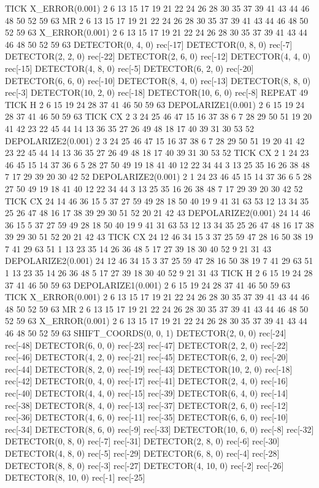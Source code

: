 TICK
X_ERROR(0.001) 2 6 13 15 17 19 21 22 24 26 28 30 35 37 39 41 43 44 46 48 50 52 59 63
MR 2 6 13 15 17 19 21 22 24 26 28 30 35 37 39 41 43 44 46 48 50 52 59 63
X_ERROR(0.001) 2 6 13 15 17 19 21 22 24 26 28 30 35 37 39 41 43 44 46 48 50 52 59 63
DETECTOR(0, 4, 0) rec[-17]
DETECTOR(0, 8, 0) rec[-7]
DETECTOR(2, 2, 0) rec[-22]
DETECTOR(2, 6, 0) rec[-12]
DETECTOR(4, 4, 0) rec[-15]
DETECTOR(4, 8, 0) rec[-5]
DETECTOR(6, 2, 0) rec[-20]
DETECTOR(6, 6, 0) rec[-10]
DETECTOR(8, 4, 0) rec[-13]
DETECTOR(8, 8, 0) rec[-3]
DETECTOR(10, 2, 0) rec[-18]
DETECTOR(10, 6, 0) rec[-8]
REPEAT 49 {
    TICK
    H 2 6 15 19 24 28 37 41 46 50 59 63
    DEPOLARIZE1(0.001) 2 6 15 19 24 28 37 41 46 50 59 63
    TICK
    CX 2 3 24 25 46 47 15 16 37 38 6 7 28 29 50 51 19 20 41 42 23 22 45 44 14 13 36 35 27 26 49 48 18 17 40 39 31 30 53 52
    DEPOLARIZE2(0.001) 2 3 24 25 46 47 15 16 37 38 6 7 28 29 50 51 19 20 41 42 23 22 45 44 14 13 36 35 27 26 49 48 18 17 40 39 31 30 53 52
    TICK
    CX 2 1 24 23 46 45 15 14 37 36 6 5 28 27 50 49 19 18 41 40 12 22 34 44 3 13 25 35 16 26 38 48 7 17 29 39 20 30 42 52
    DEPOLARIZE2(0.001) 2 1 24 23 46 45 15 14 37 36 6 5 28 27 50 49 19 18 41 40 12 22 34 44 3 13 25 35 16 26 38 48 7 17 29 39 20 30 42 52
    TICK
    CX 24 14 46 36 15 5 37 27 59 49 28 18 50 40 19 9 41 31 63 53 12 13 34 35 25 26 47 48 16 17 38 39 29 30 51 52 20 21 42 43
    DEPOLARIZE2(0.001) 24 14 46 36 15 5 37 27 59 49 28 18 50 40 19 9 41 31 63 53 12 13 34 35 25 26 47 48 16 17 38 39 29 30 51 52 20 21 42 43
    TICK
    CX 24 12 46 34 15 3 37 25 59 47 28 16 50 38 19 7 41 29 63 51 1 13 23 35 14 26 36 48 5 17 27 39 18 30 40 52 9 21 31 43
    DEPOLARIZE2(0.001) 24 12 46 34 15 3 37 25 59 47 28 16 50 38 19 7 41 29 63 51 1 13 23 35 14 26 36 48 5 17 27 39 18 30 40 52 9 21 31 43
    TICK
    H 2 6 15 19 24 28 37 41 46 50 59 63
    DEPOLARIZE1(0.001) 2 6 15 19 24 28 37 41 46 50 59 63
    TICK
    X_ERROR(0.001) 2 6 13 15 17 19 21 22 24 26 28 30 35 37 39 41 43 44 46 48 50 52 59 63
    MR 2 6 13 15 17 19 21 22 24 26 28 30 35 37 39 41 43 44 46 48 50 52 59 63
    X_ERROR(0.001) 2 6 13 15 17 19 21 22 24 26 28 30 35 37 39 41 43 44 46 48 50 52 59 63
    SHIFT_COORDS(0, 0, 1)
    DETECTOR(2, 0, 0) rec[-24] rec[-48]
    DETECTOR(6, 0, 0) rec[-23] rec[-47]
    DETECTOR(2, 2, 0) rec[-22] rec[-46]
    DETECTOR(4, 2, 0) rec[-21] rec[-45]
    DETECTOR(6, 2, 0) rec[-20] rec[-44]
    DETECTOR(8, 2, 0) rec[-19] rec[-43]
    DETECTOR(10, 2, 0) rec[-18] rec[-42]
    DETECTOR(0, 4, 0) rec[-17] rec[-41]
    DETECTOR(2, 4, 0) rec[-16] rec[-40]
    DETECTOR(4, 4, 0) rec[-15] rec[-39]
    DETECTOR(6, 4, 0) rec[-14] rec[-38]
    DETECTOR(8, 4, 0) rec[-13] rec[-37]
    DETECTOR(2, 6, 0) rec[-12] rec[-36]
    DETECTOR(4, 6, 0) rec[-11] rec[-35]
    DETECTOR(6, 6, 0) rec[-10] rec[-34]
    DETECTOR(8, 6, 0) rec[-9] rec[-33]
    DETECTOR(10, 6, 0) rec[-8] rec[-32]
    DETECTOR(0, 8, 0) rec[-7] rec[-31]
    DETECTOR(2, 8, 0) rec[-6] rec[-30]
    DETECTOR(4, 8, 0) rec[-5] rec[-29]
    DETECTOR(6, 8, 0) rec[-4] rec[-28]
    DETECTOR(8, 8, 0) rec[-3] rec[-27]
    DETECTOR(4, 10, 0) rec[-2] rec[-26]
    DETECTOR(8, 10, 0) rec[-1] rec[-25]
}
